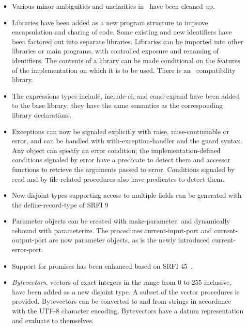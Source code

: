 \begin{itemize}

\item Various minor ambiguities and unclarities in \rfivers\ have been cleaned up.

\item Libraries have been added as a new program structure to improve
encapsulation and sharing of code.  Some existing and new identifiers
have been factored out into separate libraries.
Libraries can be imported into other libraries or main programs, with
controlled exposure and renaming of identifiers.
The contents of a library can be made conditional on the features of
the implementation on which it is to be used.
There is an \rfivers\ compatibility library.

\item The expressions types {\cf include}, {\cf include-ci}, and {\cf cond-expand}
have been added to the base library; they have the same semantics as the
corresponding library declarations.

\item Exceptions can now be signaled explicitly with {\cf raise},
{\cf raise-continuable} or {\cf error}, and can be handled with {\cf
with-exception-handler} and the {\cf guard} syntax.
Any object can specify an error condition; the implementation-defined
conditions signaled by {\cf error} have a predicate to detect them and accessor functions to
retrieve the arguments passed to {\cf error}.
Conditions signaled by {\cf read} and by file-related procedures
also have predicates to detect them.

\item New disjoint types supporting access to multiple fields can be
generated with the {\cf define-record-type} of SRFI 9~\cite{srfi9}

\item Parameter objects can be created with {\cf make-parameter}, and
dynamically rebound with {\cf parameterize}.
The procedures {\cf current-input-port} and {\cf current-output-port} are now
parameter objects, as is the newly introduced {\cf current-error-port}.

\item Support for promises has been enhanced based on SRFI 45~\cite{srfi45}.

\item {\em Bytevectors}, vectors of exact integers in the range
from 0 to 255 inclusive, have been added as a new disjoint type.
A subset of the vector procedures is provided.  Bytevectors
can be converted to and from strings in accordance with the UTF-8 character encoding.
Bytevectors have a datum representation and evaluate to themselves.


\end{itemize}
